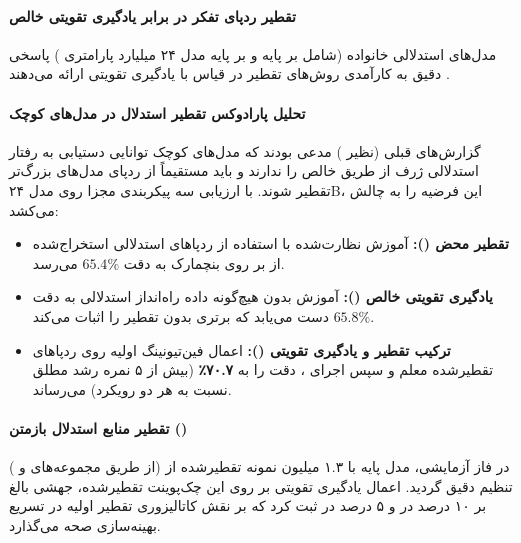 \item {}

\paragraph*{تقطیر ردپای تفکر در برابر یادگیری تقویتی خالص}
مدل‌های استدلالی خانواده  (شامل  بر پایه  و  بر پایه مدل ۲۴ میلیارد پارامتری ) پاسخی دقیق به کارآمدی روش‌های تقطیر در قیاس با یادگیری تقویتی ارائه می‌دهند \cite{magistral2025}. 

\paragraph*{تحلیل پارادوکس تقطیر استدلال در مدل‌های کوچک}
گزارش‌های قبلی (نظیر  \cite{deepseek2025r1}) مدعی بودند که مدل‌های کوچک توانایی دستیابی به رفتار استدلالی ژرف از طریق  خالص را ندارند و باید مستقیماً از ردپای مدل‌های بزرگ‌تر تقطیر شوند.  با ارزیابی سه پیکربندی مجزا روی مدل ۲۴B، این فرضیه را به چالش می‌کشد:
\begin{itemize}
    \item \textbf{تقطیر محض ():} آموزش نظارت‌شده با استفاده از ردپاهای استدلالی استخراج‌شده از  بر روی بنچمارک  به دقت $65.4\%$ می‌رسد.
    \item \textbf{یادگیری تقویتی خالص ():} آموزش بدون هیچ‌گونه داده راه‌انداز استدلالی به دقت $65.8\%$ دست می‌یابد که برتری  بدون تقطیر را اثبات می‌کند.
    \item \textbf{ترکیب تقطیر و یادگیری تقویتی ():} اعمال فین‌تیونینگ اولیه روی ردپاهای تقطیرشده معلم و سپس اجرای ، دقت  را به \textbf{۷۰.۷٪} (بیش از ۵ نمره رشد مطلق نسبت به هر دو رویکرد) می‌رساند.
\end{itemize}

\paragraph*{تقطیر منابع استدلال بازمتن ()}
در فاز آزمایشی، مدل پایه با ۱.۳ میلیون نمونه تقطیرشده از  (از طریق مجموعه‌های  و ) تنظیم دقیق گردید. اعمال یادگیری تقویتی بر روی این چک‌پوینت تقطیرشده، جهشی بالغ بر ۱۰ درصد در  و ۵ درصد در  ثبت کرد که بر نقش کاتالیزوری تقطیر اولیه در تسریع بهینه‌سازی صحه می‌گذارد.

